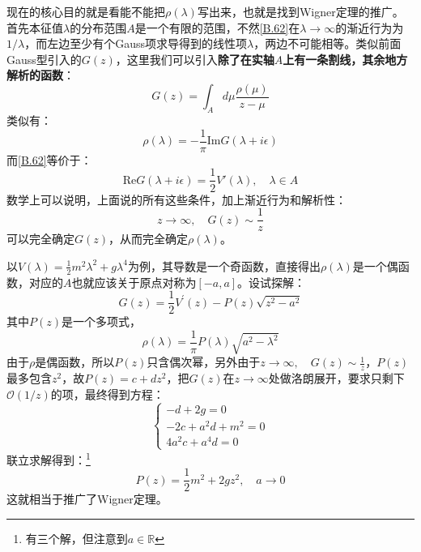 现在的核心目的就是看能不能把$\rho(\lambda)$写出来，也就是找到Wigner定理的推广。首先本征值$\lambda$的分布范围$A$是一个有限的范围，不然\ref{B.62}在$\lambda\to\infty$的渐近行为为$1/\lambda$，而左边至少有个Gauss项求导得到的线性项$\lambda$，两边不可能相等。类似前面Gauss型引入的$G(z)$，这里我们可以引入\textbf{除了在实轴$A$上有一条割线，其余地方解析的函数}：
\begin{equation}
	G(z)=\int_Ad\mu\frac{\rho(\mu)}{z-\mu}
\end{equation}
类似有：
\begin{equation}
	\rho(\lambda)=-\frac{1}{\pi}\mathrm{Im}G(\lambda+i\epsilon)
\end{equation}
而\ref{B.62}等价于：
\begin{equation}
	\mathrm{Re}G(\lambda+i\epsilon)=\frac{1}{2}V'(\lambda),\quad\lambda\in A
\end{equation}
数学上可以说明，上面说的所有这些条件，加上渐近行为和解析性：
\begin{equation}
	z\to\infty,\quad G(z)\sim\frac1z
\end{equation}
可以完全确定$G(z)$，从而完全确定$\rho(\lambda)$。
\begin{example}
	以$V(\lambda)=\frac{1}{2}m^{2}\lambda^{2}+g\lambda^{4}$为例，其导数是一个奇函数，直接得出$\rho(\lambda)$是一个偶函数，对应的$A$也就应该关于原点对称为$[-a,a]$。设试探解：
	\begin{equation}
		G(z)=\frac12V^{\prime}(z)-P(z)\sqrt{z^2-a^2}
	\end{equation}
	其中$P(z)$是一个多项式，
	\begin{equation}
		\rho(\lambda)=\frac1\pi P(\lambda)\sqrt{a^2-\lambda^2}
	\end{equation}
	由于$\rho$是偶函数，所以$P(z)$只含偶次幂，另外由于$z\to\infty,\quad G(z)\sim\frac1z$，$P(z)$最多包含$z^2$，故$P(z)=c+dz^2$，把$G(z)$在$z\to\infty$处做洛朗展开，要求只剩下$\mathcal{O}(1/z)$的项，最终得到方程：
	\begin{equation}
		\begin{cases}
			-d+2g=0\\
			-2c+a^2d+m^2=0\\
			4a^2c+a^4d=0
		\end{cases}
	\end{equation}
	联立求解得到：\footnote{有三个解，但注意到$a\in\mathbb{R}$}
	\begin{equation}
		P(z)=\frac{1}{2}m^2+2gz^2,\quad a\to 0
	\end{equation}
	这就相当于推广了Wigner定理。
\end{example}